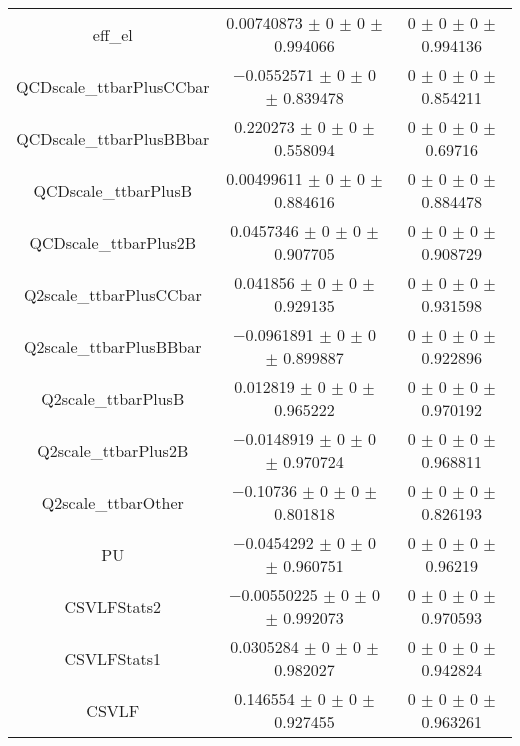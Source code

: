 \begin{table}
\begin{tabular}{ccc}
eff\_el 	& \num{0.00740873} $\pm$ \num{0} $\pm$ \num{0} $\pm$ \num{0.994066} 	& \num{0} $\pm$ \num{0} $\pm$ \num{0} $\pm$ \num{0.994136}\\
QCDscale\_ttbarPlusCCbar 	& \num{-0.0552571} $\pm$ \num{0} $\pm$ \num{0} $\pm$ \num{0.839478} 	& \num{0} $\pm$ \num{0} $\pm$ \num{0} $\pm$ \num{0.854211}\\
QCDscale\_ttbarPlusBBbar 	& \num{0.220273} $\pm$ \num{0} $\pm$ \num{0} $\pm$ \num{0.558094} 	& \num{0} $\pm$ \num{0} $\pm$ \num{0} $\pm$ \num{0.69716}\\
QCDscale\_ttbarPlusB 	& \num{0.00499611} $\pm$ \num{0} $\pm$ \num{0} $\pm$ \num{0.884616} 	& \num{0} $\pm$ \num{0} $\pm$ \num{0} $\pm$ \num{0.884478}\\
QCDscale\_ttbarPlus2B 	& \num{0.0457346} $\pm$ \num{0} $\pm$ \num{0} $\pm$ \num{0.907705} 	& \num{0} $\pm$ \num{0} $\pm$ \num{0} $\pm$ \num{0.908729}\\
Q2scale\_ttbarPlusCCbar 	& \num{0.041856} $\pm$ \num{0} $\pm$ \num{0} $\pm$ \num{0.929135} 	& \num{0} $\pm$ \num{0} $\pm$ \num{0} $\pm$ \num{0.931598}\\
Q2scale\_ttbarPlusBBbar 	& \num{-0.0961891} $\pm$ \num{0} $\pm$ \num{0} $\pm$ \num{0.899887} 	& \num{0} $\pm$ \num{0} $\pm$ \num{0} $\pm$ \num{0.922896}\\
Q2scale\_ttbarPlusB 	& \num{0.012819} $\pm$ \num{0} $\pm$ \num{0} $\pm$ \num{0.965222} 	& \num{0} $\pm$ \num{0} $\pm$ \num{0} $\pm$ \num{0.970192}\\
Q2scale\_ttbarPlus2B 	& \num{-0.0148919} $\pm$ \num{0} $\pm$ \num{0} $\pm$ \num{0.970724} 	& \num{0} $\pm$ \num{0} $\pm$ \num{0} $\pm$ \num{0.968811}\\
Q2scale\_ttbarOther 	& \num{-0.10736} $\pm$ \num{0} $\pm$ \num{0} $\pm$ \num{0.801818} 	& \num{0} $\pm$ \num{0} $\pm$ \num{0} $\pm$ \num{0.826193}\\
PU 	& \num{-0.0454292} $\pm$ \num{0} $\pm$ \num{0} $\pm$ \num{0.960751} 	& \num{0} $\pm$ \num{0} $\pm$ \num{0} $\pm$ \num{0.96219}\\
CSVLFStats2 	& \num{-0.00550225} $\pm$ \num{0} $\pm$ \num{0} $\pm$ \num{0.992073} 	& \num{0} $\pm$ \num{0} $\pm$ \num{0} $\pm$ \num{0.970593}\\
CSVLFStats1 	& \num{0.0305284} $\pm$ \num{0} $\pm$ \num{0} $\pm$ \num{0.982027} 	& \num{0} $\pm$ \num{0} $\pm$ \num{0} $\pm$ \num{0.942824}\\
CSVLF 	& \num{0.146554} $\pm$ \num{0} $\pm$ \num{0} $\pm$ \num{0.927455} 	& \num{0} $\pm$ \num{0} $\pm$ \num{0} $\pm$ \num{0.963261}\\

\end{tabular}
\end{table}
